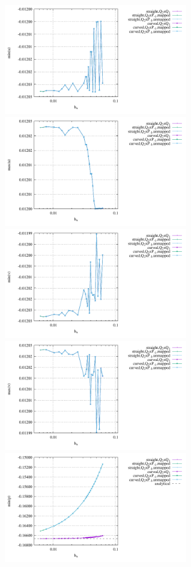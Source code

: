 \begin{center}
\includegraphics[width=8cm]{python_codes/fieldstone_25/results/doneahuerta/min_u.pdf}
\includegraphics[width=8cm]{python_codes/fieldstone_25/results/doneahuerta/max_u.pdf}\\
\includegraphics[width=8cm]{python_codes/fieldstone_25/results/doneahuerta/min_v.pdf}
\includegraphics[width=8cm]{python_codes/fieldstone_25/results/doneahuerta/max_v.pdf}\\
\includegraphics[width=8cm]{python_codes/fieldstone_25/results/doneahuerta/min_p.pdf}

\end{center}
